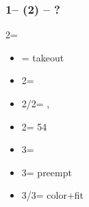 \documentclass[12pt, a4paper]{article}
\begin{document}
\subsubsection*{1\diams -- (2\clubs) -- ?}
2\nt = \minor
\begin{itemize}
    \item \dbl = takeout
    \item 2\diams = \nat
    \item 2\hearts/2\spades = \nat, \fonce
    \item 2\nt = 54\major
    \item 3\clubs = \diams \invp
    \item 3\diams = preempt
    \item 3\hearts/3\spades = color+fit
\end{itemize}

\end{document}
